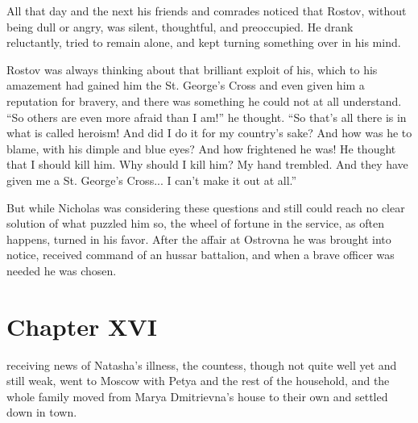 All that day and the next his friends and comrades noticed that
Rostov, without being dull or angry, was silent, thoughtful, and
preoccupied. He drank reluctantly, tried to remain alone, and
kept turning something over in his mind.

Rostov was always thinking about that brilliant exploit of his,
which to his amazement had gained him the St. George's Cross and
even given him a reputation for bravery, and there was something
he could not at all understand. ``So others are even more afraid
than I am!'' he thought. ``So that's all there is in what is
called heroism! And did I do it for my country's sake? And how
was he to blame, with his dimple and blue eyes?  And how
frightened he was! He thought that I should kill him. Why should
I kill him? My hand trembled. And they have given me a
St. George's Cross... I can't make it out at all.''

But while Nicholas was considering these questions and still
could reach no clear solution of what puzzled him so, the wheel
of fortune in the service, as often happens, turned in his
favor. After the affair at Ostrovna he was brought into notice,
received command of an hussar battalion, and when a brave officer
was needed he was chosen.


\chapter*{Chapter XVI}
\ifaudio     
{} 
\fi

 receiving news of Natasha's illness, the countess, though not
quite well yet and still weak, went to Moscow with Petya and the
rest of the household, and the whole family moved from Marya
Dmitrievna's house to their own and settled down in town.

